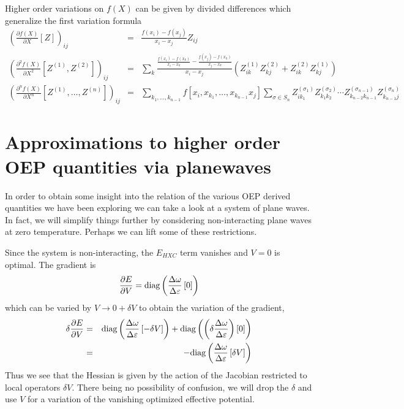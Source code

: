 \documentclass{article}
\newcommand{\beas}{\begin{eqnarray*}}
\newcommand{\enas}{\end{eqnarray*}}
\newcommand{\Vscp}{V}
\begin{document}
Higher order variations on $f(X)$ can be given by divided differences
which generalize the first variation formula
\beas
\left(\frac{\partial f(X)}{\partial X}\left[Z\right]\right)_{ij}
 &=&
  \frac{f(x_{i}) - f(x_{j})}{x_{i}-x_{j}} Z_{ij}\\
\left(\frac{\partial^2 f(X)}{\partial X^2}\left[Z^{(1)},Z^{(2)}\right]\right)_{ij}
 &=&
  \sum_k \frac{
  \frac{f(x_{i}) - f(x_{k})}{x_{i}-x_{k}}
  -\frac{f(x_{j}) - f(x_{k})}{x_{j}-x_{k}}
  }
       {x_{i}-x_{j}}
 \left(Z^{(1)}_{ik} Z^{(2)}_{kj}+Z^{(2)}_{ik} Z^{(1)}_{kj}\right)\\
\left(\frac{\partial^n f(X)}{\partial X^n}\left[Z^{(1)},\ldots,Z^{(n)}\right]\right)_{ij}
 &=&
 \sum_{k_1,\ldots,k_{n-1}} f[x_{i},x_{k_1},\ldots,x_{k_{n-1}}
                                 x_{j}]
 \sum_{\sigma \in S_n} 
  Z^{(\sigma_1)}_{ik_1} Z^{(\sigma_2)}_{k_1k_2} \cdots Z^{(\sigma_{n-1})}_{k_{n-2}k_{n-1}} Z^{(\sigma_n)}_{k_{n-1}j}
\enas

\section{Approximations to higher order OEP quantities via planewaves}

In order to obtain some insight into the relation of the various
OEP derived quantities we have been exploring we can take a look at a
system of plane waves.  In fact, we will simplify things further by
considering non-interacting plane waves at zero temperature.  Perhaps
we can lift some of these restrictions.

Since the system is non-interacting, the $E_{HXC}$ term vanishes
and $\Vscp = 0$ is optimal.  The gradient is
\beas
  \frac{\partial E}{\partial \Vscp} = 
\diag\left(\frac{\Delta \omega}{\Delta \varepsilon}\left[ 0 \right]\right)
\enas
which can be varied by $\Vscp \rightarrow 0 + \delta V$ to obtain
the variation of the gradient,
\beas
\delta \frac{\partial E}{\partial \Vscp} &=& 
\diag\left(\frac{\Delta \omega}{\Delta \varepsilon}\left[ -\delta V \right]\right)
+\diag\left(\left(\delta \frac{\Delta \omega}{\Delta \varepsilon}\right)\left[ 0 \right]\right)
\\
&=&
-\diag\left(\frac{\Delta \omega}{\Delta \varepsilon}\left[ \delta V \right]\right)
\enas
Thus we see that the Hessian is given by the action of the Jacobian
restricted to local operators $\delta V$.  There being no possibility
of confusion, we will drop the $\delta$ and use $V$ for a variation of
the vanishing optimized effective potential.
\end{document}
